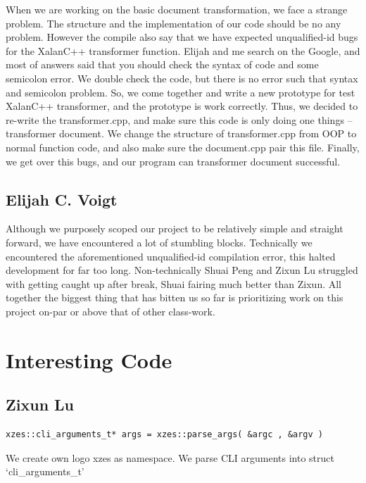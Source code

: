 When we are working on the basic document transformation, we face a strange problem.
The structure and the implementation of our code should be no any problem.
However the compile also say that we have expected unqualified-id bugs for the XalanC++ transformer function.
Elijah and me search on the Google, and most of answers said that you should check the syntax of code and some semicolon error.
We double check the code, but there is no error such that syntax and semicolon problem.
So, we come together and write a new prototype for test XalanC++ transformer, and the prototype is work correctly.
Thus, we decided to re-write the transformer.cpp, and make sure this code is only doing one things -- transformer document.
We change the structure of transformer.cpp from OOP to normal function code, and also make sure the document.cpp pair this file.
Finally, we get over this bugs, and our program can transformer document successful. 

\subsection{Elijah C. Voigt}

Although we purposely scoped our project to be relatively simple and straight forward, we have encountered a lot of stumbling blocks.
Technically we encountered the aforementioned unqualified-id compilation error, this halted development for far too long.
Non-technically Shuai Peng and Zixun Lu struggled with getting caught up after break, Shuai fairing much better than Zixun.
All together the biggest thing that has bitten us so far is prioritizing work on this project on-par or above that of other class-work.

\section{Interesting Code}

\subsection{Zixun Lu}

\begin{lstlisting}
xzes::cli_arguments_t* args = xzes::parse_args( &argc , &argv )
\end{lstlisting}
We create own logo xzes as namespace. We parse CLI arguments into struct ‘cli_arguments_t’

